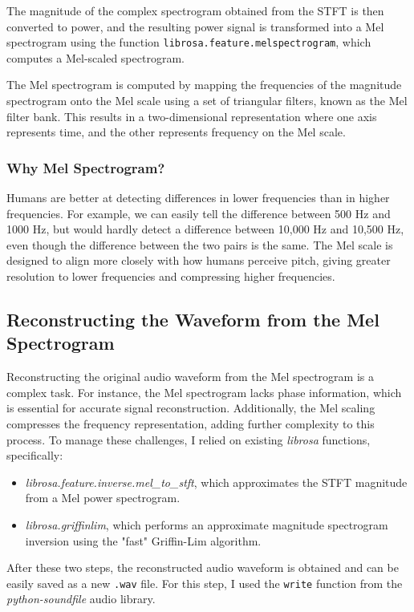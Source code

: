 \documentclass[12pt]{article}
\begin{document}
The magnitude of the complex spectrogram obtained from the STFT is then converted to power, and the resulting power signal is transformed into a Mel spectrogram using the function \texttt{librosa.feature.melspectrogram}, which computes a Mel-scaled spectrogram.

The Mel spectrogram is computed by mapping the frequencies of the magnitude spectrogram onto the Mel scale using a set of triangular filters, known as the Mel filter bank. This results in a two-dimensional representation where one axis represents time, and the other represents frequency on the Mel scale.

\subsubsection{Why Mel Spectrogram?}
Humans are better at detecting differences in lower frequencies than in higher frequencies. For example, we can easily tell the difference between 500 Hz and 1000 Hz, but would hardly detect a difference between 10,000 Hz and 10,500 Hz, even though the difference between the two pairs is the same. The Mel scale is designed to align more closely with how humans perceive pitch, giving greater resolution to lower frequencies and compressing higher frequencies.


\subsection{Reconstructing the Waveform from the Mel Spectrogram}

Reconstructing the original audio waveform from the Mel spectrogram is a complex task. For instance, the Mel spectrogram lacks phase information, which is essential for accurate signal reconstruction. Additionally, the Mel scaling compresses the frequency representation, adding further complexity to this process. To manage these challenges, I relied on existing \textit{librosa} functions, specifically:

\begin{itemize}
    \item \textit{librosa.feature.inverse.mel\_to\_stft}, which approximates the STFT magnitude from a Mel power spectrogram.
    \item \textit{librosa.griffinlim}, which performs an approximate magnitude spectrogram inversion using the "fast" Griffin-Lim algorithm.
\end{itemize}

After these two steps, the reconstructed audio waveform is obtained and can be easily saved as a new \texttt{.wav} file. For this step, I used the \texttt{write} function from the \textit{python-soundfile} audio library.
\end{document}
